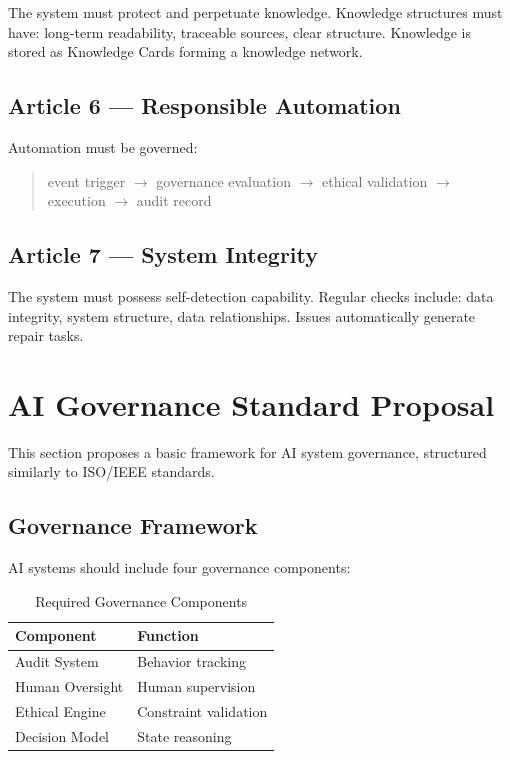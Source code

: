 \documentclass[conference]{IEEEtran}
\begin{document}
The system must protect and perpetuate knowledge.
Knowledge structures must have:
long-term readability, traceable sources, clear structure.
Knowledge is stored as Knowledge Cards forming a knowledge network.

\subsection{Article 6 --- Responsible Automation}

Automation must be governed:
\begin{quote}
event trigger $\to$ governance evaluation $\to$ ethical validation
$\to$ execution $\to$ audit record
\end{quote}

\subsection{Article 7 --- System Integrity}

The system must possess self-detection capability.
Regular checks include:
data integrity, system structure, data relationships.
Issues automatically generate repair tasks.

\section{AI Governance Standard Proposal}

This section proposes a basic framework for AI system governance,
structured similarly to ISO/IEEE standards.

\subsection{Governance Framework}

AI systems should include four governance components:

\begin{table}[t]
\centering
\caption{Required Governance Components}
\label{tab:govcomponents}
\renewcommand{\arraystretch}{1.2}
\begin{tabular}{ll}
\toprule
\textbf{Component} & \textbf{Function} \\
\midrule
Audit System & Behavior tracking \\
Human Oversight & Human supervision \\
Ethical Engine & Constraint validation \\
Decision Model & State reasoning \\
\bottomrule
\end{tabular}
\end{table}
\end{document}
